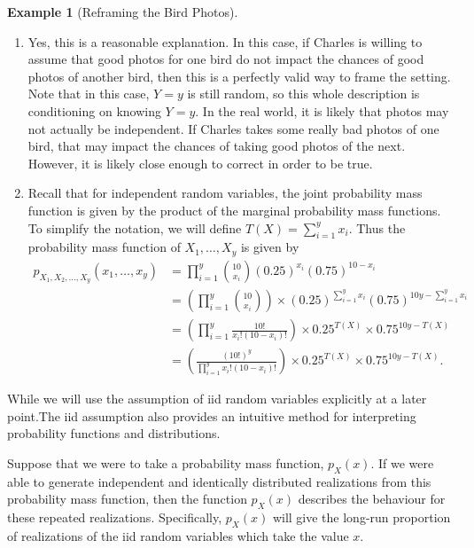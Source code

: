 \documentclass[
  letterpaper,
  DIV=11,
  numbers=noendperiod]{scrreprt}
\theoremstyle{definition}
\theoremstyle{definition}
\newtheorem{example}{Example}[chapter]
\theoremstyle{definition}
\theoremstyle{remark}
\begin{document}
\begin{example}[Reframing the Bird
Photos]
\begin{tcolorbox}[enhanced jigsaw, colback=white, colframe=quarto-callout-color-frame, arc=.35mm, leftrule=.75mm, rightrule=.15mm, opacityback=0, breakable, bottomrule=.15mm, left=2mm, toprule=.15mm]
\begin{enumerate}
\def\labelenumi{\alph{enumi}.}
\item
  Yes, this is a reasonable explanation. In this case, if Charles is
  willing to assume that good photos for one bird do not impact the
  chances of good photos of another bird, then this is a perfectly valid
  way to frame the setting. Note that in this case, \(Y=y\) is still
  random, so this whole description is conditioning on knowing \(Y=y\).
  In the real world, it is likely that photos may not actually be
  independent. If Charles takes some really bad photos of one bird, that
  may impact the chances of taking good photos of the next. However, it
  is likely close enough to correct in order to be true.
\item
  Recall that for independent random variables, the joint probability
  mass function is given by the product of the marginal probability mass
  functions. To simplify the notation, we will define
  \(T(X) = \sum_{i=1}^y x_i\). Thus the probability mass function of
  \(X_1,\dots,X_y\) is given by \begin{align*}
   p_{X_1,X_2,\dots,X_y}(x_1,\dots,x_y) &= \prod_{i=1}^y \binom{10}{x_i}(0.25)^{x_i}(0.75)^{10-x_i} \\
   &= \left(\prod_{i=1}^y\binom{10}{x_i}\right)\times(0.25)^{\sum_{i=1}^y x_i}(0.75)^{10y - \sum_{i=1}^yx_i} \\
   &= \left(\prod_{i=1}^y \frac{10!}{x_i!(10-x_i)!}\right)\times 0.25^{T(X)}\times 0.75^{10y - T(X)} \\
   &= \left(\frac{(10!)^y}{\prod_{i=1}^y x_i!(10 - x_i)!}\right)\times 0.25^{T(X)}\times 0.75^{10y - T(X)}.
  \end{align*}
\end{enumerate}

\end{tcolorbox}

\end{example}

While we will use the assumption of iid random variables explicitly at a
later point.The iid assumption also provides an intuitive method for
interpreting probability functions and distributions.

Suppose that we were to take a probability mass function, \(p_X(x)\). If
we were able to generate independent and identically distributed
realizations from this probability mass function, then the function
\(p_X(x)\) describes the behaviour for these repeated realizations.
Specifically, \(p_X(x)\) will give the long-run proportion of
realizations of the iid random variables which take the value \(x\).
\end{document}
